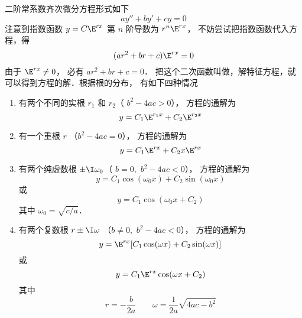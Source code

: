 

二阶常系数齐次微分方程形式如下
\begin{equation}
ay'' + by' + cy = 0
\end{equation}
注意到指数函数 $y = C \E^{rx}$ 第 $n$ 阶导数为 $r^n \E^{rx}$， 不妨尝试把指数函数代入方程，得
\begin{equation}
(a r^2 + br + c) \E^{rx} = 0
\end{equation}
由于 $\E^{rx} \ne 0$， 必有 $a r^2 + br + c = 0$． 把这个二次函数叫做，解特征方程，就可以得到方程的解．根据根的分布， 有如下四种情况

\begin{enumerate}
\item 有两个不同的实根 $r_1$ 和  $r_2$（ $b^2 - 4ac > 0$）， 方程的通解为
 \begin{equation}
y = C_1 \E^{r_1 x} + C_2 \E^{r_2 x}
\end{equation}
\item 有一个重根 $r$ （$b^2 - 4ac = 0$）， 方程的通解为
\begin{equation}\label{Ode2_eq4}
y = C_1 \E^{rx} + C_2 x \E^{rx}
\end{equation}
\item 有两个纯虚数根 $\pm \I \omega_0$（ $b = 0,\,\, b^2 - 4ac < 0$）， 方程的通解为
\begin{equation}
y = C_1\cos(\omega_0 x) + C_2 \sin(\omega_0 x)
\end{equation}
或 
\begin{equation}
y = C_1\cos(\omega_0 x + C_2)
\end{equation} 
其中 $\omega_0 = \sqrt{c/a}$． 

\item 有两个复数根 $r \pm \I\omega$ （$b \ne 0,\,\, b^2 - 4ac < 0$）， 方程的通解为
\begin{equation}\label{Ode2_eq7}
y = \E^{rx} [ C_1\cos(\omega x) + C_2\sin(\omega x) ]
\end{equation} 
或 
\begin{equation}
y = C_1\E^{rx}\cos(\omega x + C_2)
\end{equation} 
其中
\begin{equation}
r =  - \frac{b}{2a} \qquad \omega  = \frac{1}{2a}\sqrt{4ac - b^2} 
\end{equation}

\end{enumerate}


